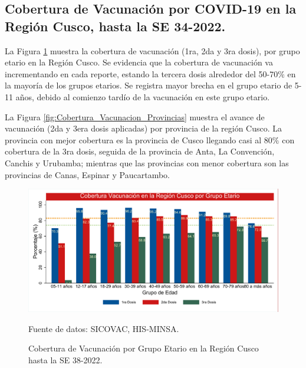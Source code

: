 \documentclass[12pt,a4paper,openany]{book}
\begin{document}
	\subsection*{Cobertura de Vacunación por COVID-19 en la Región Cusco, hasta la SE 34-2022.}
	\noindent La Figura \ref{fig:vacuna_edad} muestra la cobertura de vacunación (1ra, 2da y 3ra dosis), por grupo etario en la Región Cusco. Se evidencia que la cobertura de vacunación va incrementando en cada reporte, estando la tercera dosis alrededor del 50-70$\%$ en la mayoría de los grupos etarios. Se registra mayor brecha en el grupo etario de 5-11 años, debido al comienzo tardío de la vacunación en este grupo etario.
	
	La Figura \ref{fig:Cobertura_Vacunacion_Provincias} muestra el avance de vacunación (2da y 3era dosis aplicadas) por provincia de la región Cusco. La provincia con mejor cobertura es la provincia de Cusco llegando casi al 80$\%$ con cobertura de la 3ra dosis, seguida de la provincia de Anta, La Convención, Canchis y Urubamba; mientras que las provincias con menor cobertura son las provincias de Canas, Espinar y Paucartambo. 
	\begin{figure}[h]
		\caption{Cobertura de Vacunación por Grupo Etario en la Región Cusco hasta la SE 38-2022. }\label{fig:vacuna_edad}
		\begin{center}
			\includegraphics[width=0.85\linewidth]{../figuras/vacunacion_grupo_edad_dosis.pdf}
		\end{center}
		{\footnotesize {Fuente de datos: SICOVAC, HIS-MINSA.}}
	\end{figure}
	\clearpage
	
\end{document}
